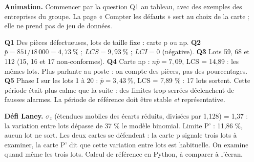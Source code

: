 \documentclass[10pt,a4paper]{article}
\begin{document}
\textbf{Animation.} Commencer par la question Q1 au tableau, avec des exemples des entreprises du groupe. La page « Compter les défauts » sert au choix de la carte ; elle ne prend pas de jeu de données.
\begin{tcolorbox}[corr]
\textbf{Q1} Des pièces défectueuses, lots de taille fixe : carte p ou np. \textbf{Q2} $\bar p = 851 / 18\,000 = 4{,}73\ \%$ ; $LCS = 9{,}93\ \%$ ; $LCI = 0$ (négative). \textbf{Q3} Lots 59, 68 et 112 (15, 16 et 17 non-conformes). \textbf{Q4} Carte np : $n\bar p = 7{,}09$, LCS = 14,89 : les mêmes lots. Plus parlante au poste : on compte des pièces, pas des pourcentages. \textbf{Q5} Phase I sur les lots 1 à 20 : $\bar p = 3{,}43\ \%$, LCS = 7,89 \% : 17 lots sortent. Cette période était plus calme que la suite : des limites trop serrées déclenchent de fausses alarmes. La période de référence doit être stable \emph{et} représentative.

\textbf{Défi Laney.} $\sigma_z$ (étendues mobiles des écarts réduits, divisées par 1,128) = 1,37 : la variation entre lots dépasse de 37 \% le modèle binomial. Limite P' : 11,86 \%, aucun lot ne sort. Les deux cartes se défendent : la carte p signale trois lots à examiner, la carte P' dit que cette variation entre lots est habituelle. On examine quand même les trois lots. Calcul de référence en Python, à comparer à l'écran.
\end{tcolorbox}
\end{document}
